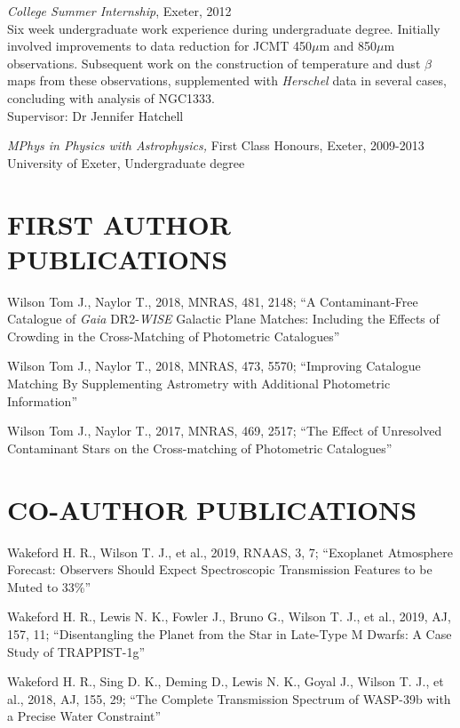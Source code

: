 \documentclass[letter, margin, 10pt]{res} %
\begin{document}
\begin{resume}
{\sl College Summer Internship}, Exeter, 2012\\
Six week undergraduate work experience during undergraduate degree. Initially involved improvements to data reduction for JCMT 450$\mu$m and 850$\mu$m observations. Subsequent work on the construction of temperature and dust $\beta$ maps from these observations, supplemented with \textit{Herschel} data in several cases, concluding with analysis of NGC1333.\\Supervisor: Dr Jennifer Hatchell

{\sl MPhys in Physics with Astrophysics,} First Class Honours, Exeter, 2009-2013 \\
University of Exeter, Undergraduate degree

\parskip 5pt
\section{FIRST AUTHOR PUBLICATIONS}

Wilson Tom J., Naylor T., 2018, MNRAS, 481, 2148; ``A Contaminant-Free Catalogue of \textit{Gaia} DR2-\textit{WISE} Galactic Plane Matches: Including the Effects of Crowding in the Cross-Matching of Photometric Catalogues''

Wilson Tom J., Naylor T., 2018, MNRAS, 473, 5570; ``Improving Catalogue Matching By Supplementing Astrometry with Additional Photometric Information''

Wilson Tom J., Naylor T., 2017, MNRAS, 469, 2517; ``The Effect of Unresolved Contaminant Stars on the Cross-matching of Photometric Catalogues''

\section{CO-AUTHOR PUBLICATIONS}
  
Wakeford H. R., Wilson T. J., et al., 2019, RNAAS, 3, 7; ``Exoplanet Atmosphere Forecast: Observers Should Expect Spectroscopic Transmission Features to be Muted to 33\%''

Wakeford H. R., Lewis N. K., Fowler J., Bruno G., Wilson T. J., et al., 2019, AJ, 157, 11; ``Disentangling the Planet from the Star in Late-Type M Dwarfs: A Case Study of TRAPPIST-1g''

Wakeford H. R., Sing D. K., Deming D., Lewis N. K., Goyal J., Wilson T. J., et al., 2018, AJ, 155, 29; ``The Complete Transmission Spectrum of WASP-39b with a Precise Water Constraint''


\end{resume}
\end{document}
